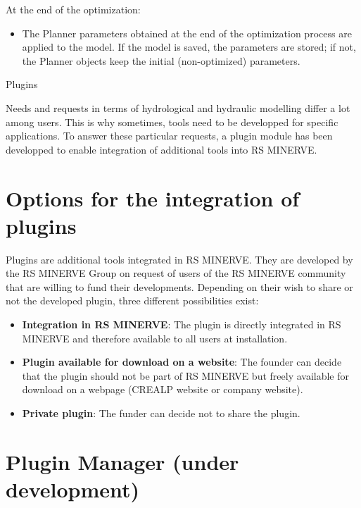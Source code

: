 \documentclass[
  letterpaper,
  DIV=11,
  numbers=noendperiod]{scrreprt}
\providecommand{\tightlist}{%
  \setlength{\itemsep}{0pt}\setlength{\parskip}{0pt}}\usepackage{longtable,booktabs,array}
\begin{document}
At the end of the optimization:

\begin{itemize}
\tightlist
\item
  The Planner parameters obtained at the end of the optimization process
  are applied to the model. If the model is saved, the parameters are
  stored; if not, the Planner objects keep the initial (non-optimized)
  parameters.
\end{itemize}

Plugins

Needs and requests in terms of hydrological and hydraulic modelling
differ a lot among users. This is why sometimes, tools need to be
developped for specific applications. To answer these particular
requests, a plugin module has been developped to enable integration of
additional tools into RS MINERVE.

\hypertarget{options-for-the-integration-of-plugins}{%
\chapter{Options for the integration of
plugins}\label{options-for-the-integration-of-plugins}}

Plugins are additional tools integrated in RS MINERVE. They are
developed by the RS MINERVE Group on request of users of the RS MINERVE
community that are willing to fund their developments. Depending on
their wish to share or not the developed plugin, three different
possibilities exist:

\begin{itemize}
\item
  \textbf{Integration in RS MINERVE}: The plugin is directly integrated
  in RS MINERVE and therefore available to all users at installation.
\item
  \textbf{Plugin available for download on a website}: The founder can
  decide that the plugin should not be part of RS MINERVE but freely
  available for download on a webpage (CREALP website or company
  website).
\item
  \textbf{Private plugin}: The funder can decide not to share the
  plugin.
\end{itemize}

\hypertarget{plugin-manager-under-development}{%
\chapter{Plugin Manager (under
development)}\label{plugin-manager-under-development}}
\end{document}
